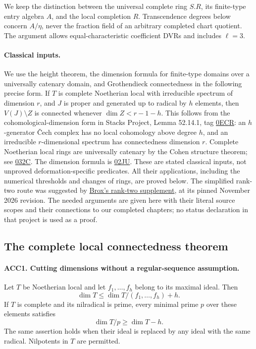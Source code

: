 We keep the distinction between the universal complete ring \(S.R\),
its finite-type entry algebra \(A\), and the local completion \(R\).
Transcendence degrees below concern \(A/\eta\), never the fraction
field of an arbitrary completed chart quotient.  The argument allows
equal-characteristic coefficient DVRs and includes \(\ell=3\).

\paragraph{Classical inputs.}
We use the height theorem, the dimension formula for finite-type
domains over a universally catenary domain, and Grothendieck
connectedness in the following precise form.  If \(T\) is complete
Noetherian local with irreducible spectrum of dimension \(r\), and
\(J\) is proper and generated up to radical by \(h\) elements, then
\(V(J)\setminus Z\) is connected whenever
\(\dim Z<r-1-h\).  This follows from the cohomological-dimension
form in Stacks Project, Lemma 52.14.1, tag
\href{https://stacks.math.columbia.edu/tag/0ECR}{0ECR}:
an \(h\)-generator \v Cech complex has no local cohomology above
degree \(h\), and an irreducible \(r\)-dimensional spectrum has
connectedness dimension \(r\).  Complete Noetherian local rings are
universally catenary by the Cohen structure theorem; see
\href{https://stacks.math.columbia.edu/tag/032C}{032C}.
The dimension formula is
\href{https://stacks.math.columbia.edu/tag/02JU}{02JU}.
These are stated classical inputs, not unproved deformation-specific
predicates.  All their applications, including the numerical thresholds
and changes of rings, are proved below.  The simplified rank-two route
was suggested by
\href{https://github.com/JoseBrox/GRH_distillation/blob/fd38313e5c7018c3c988ba20510e6b0b3bca0519/paper/shared/selmer-support-continuation-rank-two.tex}
{Brox's rank-two supplement}, at its pinned November 2026 revision.
The needed arguments are given here with their literal source scopes
and their connections to our completed chapters; no status declaration
in that project is used as a proof.

\subsection{The complete local connectedness theorem}

\paragraph{ACC1. Cutting dimensions without a regular-sequence assumption.}
\label{claim:ACC1}
Let \(T\) be Noetherian local and let \(f_1,\ldots,f_h\)
belong to its maximal ideal.  Then
\[
 \dim T\le \dim T/(f_1,\ldots,f_h)+h.                    \tag{ACC.3}
\]
If \(T\) is complete and its nilradical is prime, every minimal
prime \(p\) over these elements satisfies
\[
                        \dim T/p\ge \dim T-h.            \tag{ACC.4}
\]
The same assertion holds when their ideal is replaced by any ideal
with the same radical.  Nilpotents in \(T\) are permitted.

